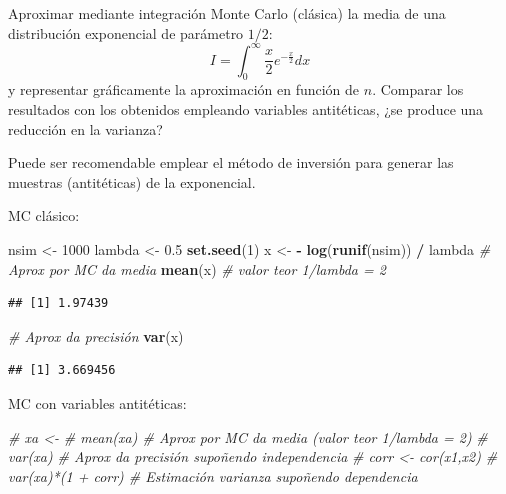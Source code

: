\documentclass[]{book}
\newenvironment{Shaded}{\begin{snugshade}}{\end{snugshade}}
\newcommand{\KeywordTok}[1]{\textcolor[rgb]{0.13,0.29,0.53}{\textbf{#1}}}
\newcommand{\DecValTok}[1]{\textcolor[rgb]{0.00,0.00,0.81}{#1}}
\newcommand{\FloatTok}[1]{\textcolor[rgb]{0.00,0.00,0.81}{#1}}
\newcommand{\StringTok}[1]{\textcolor[rgb]{0.31,0.60,0.02}{#1}}
\newcommand{\CommentTok}[1]{\textcolor[rgb]{0.56,0.35,0.01}{\textit{#1}}}
\newcommand{\OperatorTok}[1]{\textcolor[rgb]{0.81,0.36,0.00}{\textbf{#1}}}
\newcommand{\NormalTok}[1]{#1}
\theoremstyle{definition}
\theoremstyle{definition}
\theoremstyle{definition}
\theoremstyle{remark}
\let\BeginKnitrBlock\begin \let\EndKnitrBlock\end
\begin{document}
\BeginKnitrBlock{exercise}
\protect\hypertarget{exr:unnamed-chunk-20}{}{\label{exr:unnamed-chunk-20} }
\EndKnitrBlock{exercise}

Aproximar mediante integración Monte Carlo (clásica) la media de una
distribución exponencial de parámetro
\(1/2\):\[I=\int_{0}^{\infty}\frac{x}{2}e^{-\frac{x}{2}}dx\] y
representar gráficamente la aproximación en función de \(n\). Comparar
los resultados con los obtenidos empleando variables antitéticas, ¿se
produce una reducción en la varianza?

\BeginKnitrBlock{remark}
{}Puede ser recomendable emplear el método de
inversión para generar las muestras (antitéticas) de la exponencial.
\EndKnitrBlock{remark}

MC clásico:

\begin{Shaded}
\begin{Highlighting}[]
\NormalTok{nsim <-}\StringTok{ }\DecValTok{1000}
\NormalTok{lambda <-}\StringTok{ }\FloatTok{0.5}
\KeywordTok{set.seed}\NormalTok{(}\DecValTok{1}\NormalTok{)}
\NormalTok{x <-}\StringTok{ }\OperatorTok{-}\StringTok{ }\KeywordTok{log}\NormalTok{(}\KeywordTok{runif}\NormalTok{(nsim)) }\OperatorTok{/}\StringTok{ }\NormalTok{lambda}
\CommentTok{# Aprox por MC da media }
\KeywordTok{mean}\NormalTok{(x) }\CommentTok{# valor teor 1/lambda = 2}
\end{Highlighting}
\end{Shaded}

\begin{verbatim}
## [1] 1.97439
\end{verbatim}

\begin{Shaded}
\begin{Highlighting}[]
\CommentTok{# Aprox da precisión }
\KeywordTok{var}\NormalTok{(x)  }
\end{Highlighting}
\end{Shaded}

\begin{verbatim}
## [1] 3.669456
\end{verbatim}

MC con variables antitéticas:

\begin{Shaded}
\begin{Highlighting}[]
\CommentTok{# xa <-}
\CommentTok{# mean(xa) # Aprox por MC da media (valor teor 1/lambda = 2)}
\CommentTok{# var(xa)  # Aprox da precisión supoñendo independencia}
\CommentTok{# corr <- cor(x1,x2)}
\CommentTok{# var(xa)*(1 + corr) # Estimación varianza supoñendo dependencia}
\end{Highlighting}
\end{Shaded}
\end{document}
